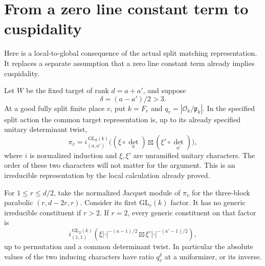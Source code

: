 
\section{From a zero line constant term to cuspidality}
\label{sec:sr-theta-line-cuspidality}

Here is a local-to-global consequence of the actual split matching
representation. It replaces a separate assumption that a zero line
constant term already implies cuspidality.

Let \(W\) be the fixed target of rank \(d=a+a'\), and suppose
\[
                    \delta=(a-a')/2>3.
\]
At a good fully split finite place \(v\), put \(k=F_v\) and
\(q_v=|\mathcal O_k/\mathfrak p_k|\).
In the specified split action the common target representation is,
up to its already specified unitary determinant twist,
\[
 \pi_v=
 i_{(a,a')}^{\,\mathrm{GL}_d(k)}
       \bigl((\xi\circ\det_a)\boxtimes
                         (\xi'\circ\det_{a'})\bigr),
 \tag{U1}\label{eq:sr-cusp-line-local-representation}
\]
where \(i\) is normalized induction and \(\xi,\xi'\) are
unramified unitary characters. The order of these two characters
will not matter for the argument. This is an irreducible
representation by the local calculation already proved.

\begin{srlemma}
\label{lem:sr-cusp-line-jacquet}
For \(1\le r\le d/2\), take the normalized Jacquet module of
\(\pi_v\) for the three-block parabolic
\((r,d-2r,r)\).
Consider its first \(\mathrm{GL}_r(k)\) factor.
It has no generic irreducible constituent if \(r>2\).
If \(r=2\), every generic constituent on that factor is
\[
 i_{(1,1)}^{\,\mathrm{GL}_2(k)}
   \left(\xi|\cdot|^{-(a-1)/2}\boxtimes
                      \xi'|\cdot|^{-(a'-1)/2}\right),
 \tag{U2}\label{eq:sr-cusp-line-GL2-piece}
\]
up to permutation and a common determinant twist.
In particular the absolute values of the two inducing characters
have ratio \(q_v^\delta\) at a uniformizer, or its inverse.
\end{srlemma}

